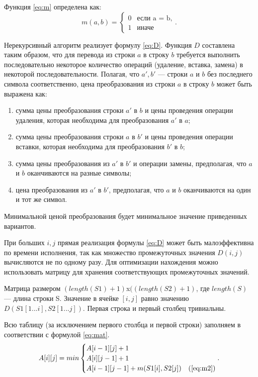 Функция \ref{eq:m} определена как:
\begin{equation}
	\label{eq:m}
	m(a, b) = \begin{cases}
		0 &\text{если a = b,}\\
		1 &\text{иначе}
	\end{cases}.
\end{equation}

Нерекурсивный алгоритм реализует формулу \ref{eq:D}.
Функция $D$ составлена таким образом, что для перевода из строки $a$ в строку $b$ требуется выполнить последовательно некоторое количество операций (удаление, вставка, замена) в некоторой последовательности. Полагая, что $a', b'$  — строки $a$ и $b$ без последнего символа соответственно, цена преобразования из строки $a$ в строку $b$ может быть выражена как:
\begin{enumerate}[label={\arabic*)}]
	\item сумма цены преобразования строки $a'$ в $b$ и цены проведения операции удаления, которая необходима для преобразования $a'$ в $a$;
	\item сумма цены преобразования строки $a$ в $b'$  и цены проведения операции вставки, которая необходима для преобразования $b'$ в $b$;
	\item сумма цены преобразования из $a'$ в $b'$ и операции замены, предполагая, что $a$ и $b$ оканчиваются на разные символы;
	\item цена преобразования из $a'$ в $b'$, предполагая, что $a$ и $b$ оканчиваются на один и тот же символ.
\end{enumerate}
Минимальной ценой преобразования будет минимальное значение приведенных вариантов.

При больших $i, j$ прямая реализация формулы \ref{eq:D} может быть малоэффективна по времени исполнения, так как множество промежуточных значения $ D(i, j)$ вычисляются не по одному разу. Для оптимизации нахождения можно использовать матрицу для хранения соответствующих промежуточных значений.

Матрица размером $(length(S1)+ 1)$x$((length(S2) + 1)$, где $length(S)$ — длина строки S. Значение в ячейке $[i, j]$ равно значению $D(S1[1...i], S2[1...j])$. Первая строка и первый столбец тривиальны. 

Всю таблицу (за исключением первого столбца и первой строки) заполняем в соответствии с формулой \ref{eq:mat}.
\begin{equation}
	\label{eq:mat}
	A[i][j] = min \begin{cases}
		A[i-1][j] + 1\\
		 A[i][j-1] + 1\\
		 A[i-1][j-1] + m(S1[i], S2[j])&\text(\ref{eq:m2})\\
	 \end{cases}.
 \end{equation}

